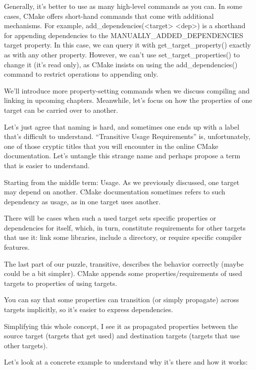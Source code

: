 Generally, it’s better to use as many high-level commands as you can. In some cases, CMake offers short-hand commands that come with additional mechanisms. For example, add\_dependencies(<target> <dep>) is a shorthand for appending dependencies to the MANUALLY\_ADDED\_DEPENDENCIES target property. In this case, we can query it with get\_target\_property() exactly as with any other property. However, we can’t use set\_target\_properties() to change it (it’s read only), as CMake insists on using the add\_dependencies() command to restrict operations to appending only.

We’ll introduce more property-setting commands when we discuss compiling and linking in upcoming chapters. Meanwhile, let’s focus on how the properties of one target can be carried over to another.


Let’s just agree that naming is hard, and sometimes one ends up with a label that’s difficult to understand. “Transitive Usage Requirements” is, unfortunately, one of those cryptic titles that you will encounter in the online CMake documentation. Let’s untangle this strange name and perhaps propose a term that is easier to understand.

Starting from the middle term: Usage. As we previously discussed, one target may depend on another. CMake documentation sometimes refers to such dependency as usage, as in one target uses another.

There will be cases when such a used target sets specific properties or dependencies for itself, which, in turn, constitute requirements for other targets that use it: link some libraries, include a directory, or require specific compiler features.

The last part of our puzzle, transitive, describes the behavior correctly (maybe could be a bit simpler). CMake appends some properties/requirements of used targets to properties of using targets.

You can say that some properties can transition (or simply propagate) across targets implicitly, so it’s easier to express dependencies.

Simplifying this whole concept, I see it as propagated properties between the source target (targets that get used) and destination targets (targets that use other targets).

Let’s look at a concrete example to understand why it’s there and how it works:

